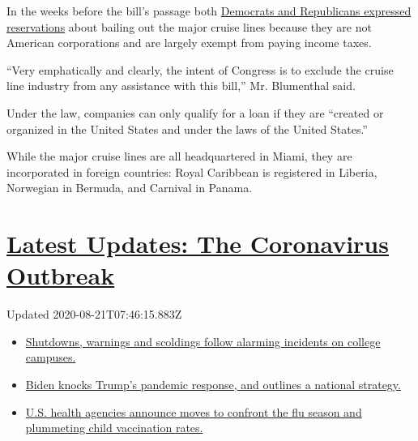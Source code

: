 In the weeks before the bill's passage both
\href{https://www.mcclatchydc.com/news/politics-government/white-house/article241044301.html}{Democrats
and Republicans expressed reservations} about bailing out the major
cruise lines because they are not American corporations and are largely
exempt from paying income taxes.

``Very emphatically and clearly, the intent of Congress is to exclude
the cruise line industry from any assistance with this bill,'' Mr.
Blumenthal said.

Under the law, companies can only qualify for a loan if they are
``created or organized in the United States and under the laws of the
United States.''

While the major cruise lines are all headquartered in Miami, they are
incorporated in foreign countries: Royal Caribbean is registered in
Liberia, Norwegian in Bermuda, and Carnival in Panama.

\hypertarget{latest-updates-the-coronavirus-outbreak}{%
\section{\texorpdfstring{\href{https://www.nytimes3xbfgragh.onion/2020/08/20/world/coronavirus-covid.html?action=click\&pgtype=Article\&state=default\&region=MAIN_CONTENT_1\&context=storylines_live_updates}{Latest
Updates: The Coronavirus
Outbreak}}{Latest Updates: The Coronavirus Outbreak}}\label{latest-updates-the-coronavirus-outbreak}}

Updated 2020-08-21T07:46:15.883Z

\begin{itemize}
\tightlist
\item
  \href{https://www.nytimes3xbfgragh.onion/2020/08/20/world/coronavirus-covid.html?action=click\&pgtype=Article\&state=default\&region=MAIN_CONTENT_1\&context=storylines_live_updates\#link-68774d88}{Shutdowns,
  warnings and scoldings follow alarming incidents on college campuses.}
\item
  \href{https://www.nytimes3xbfgragh.onion/2020/08/20/world/coronavirus-covid.html?action=click\&pgtype=Article\&state=default\&region=MAIN_CONTENT_1\&context=storylines_live_updates\#link-26b58724}{Biden
  knocks Trump's pandemic response, and outlines a national strategy.}
\item
  \href{https://www.nytimes3xbfgragh.onion/2020/08/20/world/coronavirus-covid.html?action=click\&pgtype=Article\&state=default\&region=MAIN_CONTENT_1\&context=storylines_live_updates\#link-4e542da3}{U.S.
  health agencies announce moves to confront the flu season and
  plummeting child vaccination rates.}
\end{itemize}

